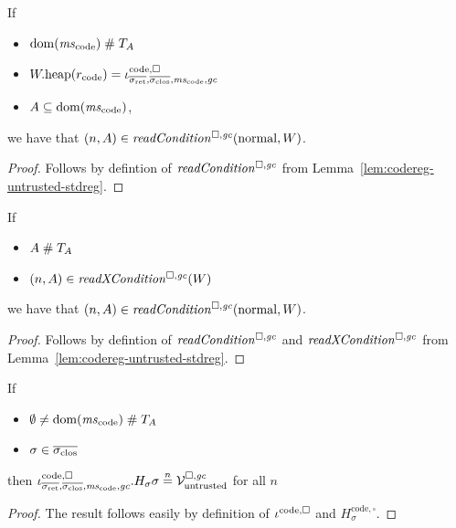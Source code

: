 \documentclass[a4paper]{article}
\begin{document}
\begin{lemma}
  \label{lem:code-memory-untrusted-readable}
  If
  \begin{itemize}
  \item $\dom(\mscode) \mathrel{\#} \ta$
  \item $\pwheap(r_{\mathrm{code}}) = \codereg{\sigrets,\sigcloss,\mscode,\gc}$
  \item $A \subseteq \dom(\mscode)$,
  \end{itemize}
  we have that $\npair{A} \in \readCond{\normal,W}$.
\end{lemma}
\begin{proof}
  Follows by defintion of $\readCond{}$ from Lemma~\ref{lem:codereg-untrusted-stdreg}.
\end{proof}

\begin{lemma}
  \label{lem:xReadCond-outside-ta-implies-readCond}
  If
  \begin{itemize}
  \item $A \mathrel{\#} T_{A}$
  \item $\npair{A} \in \xReadCond{W}$
  \end{itemize}
  we have that $\npair{A} \in \readCond{\normal,W}$.
\end{lemma}
\begin{proof}
  Follows by defintion of $\readCond{}$ and $\xReadCond{}$ from Lemma~\ref{lem:codereg-untrusted-stdreg}.
\end{proof}

\begin{lemma}
  \label{lem:codereg-sealing-safety}
  If
  \begin{itemize}
  \item $\emptyset\neq\dom(\mscode) \mathrel{\#} \ta$
  \item $\sigma \in \sigcloss$
  \end{itemize}
  then $\codereg{\sigrets,\sigcloss,\mscode,\gc}.H_\sigma \sigma \nequal \lrv$ for all $n$
\end{lemma}
\begin{proof}
  The result follows easily by definition of $\iota^{\mathrm{code},\square}_{}$ and $H^\mathrm{code,\square}_\sigma$.
\end{proof}
\end{document}
